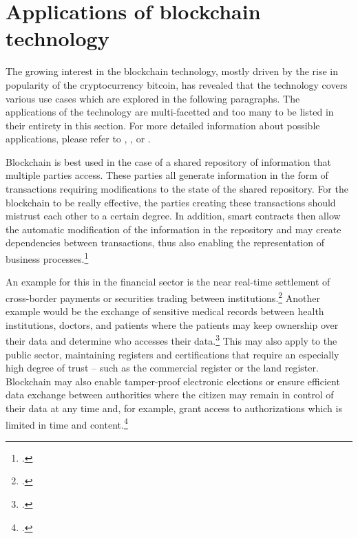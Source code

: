 \section{Applications of blockchain technology} \label{sec:SmartContracts}
The growing interest in the blockchain technology, mostly driven by the rise in popularity of the cryptocurrency bitcoin, has revealed that the technology covers various use cases which are explored in the following paragraphs. The applications of the technology are multi-facetted and too many to be listed in their entirety in this section. For more detailed information about possible applications, please refer to \cite{AntonopolousAndreasM..2017}, \cite{SchatskybitcoinBlockchaincoming2015}, or \cite{Schutte.2017}.

Blockchain is best used in the case of a shared repository of information that multiple parties access. These parties all generate information in the form of transactions requiring modifications to the state of the shared repository. For the blockchain to be really effective, the parties creating these transactions should mistrust each other to a certain degree. In addition, smart contracts then allow the automatic modification of the information in the repository and may create dependencies between transactions, thus also enabling the representation of business processes.\footcites[Cf.][p.8]{MulliganBlockchainHypePractical2018}[cf.][p.5]{Tapscott.2017}[cf.][p.166]{DannenIntroducingethereumsolidity2017}

An example for this in the financial sector is the near real-time settlement of cross-border payments or securities trading between institutions.\footcite[Cf.][]{SchatskybitcoinBlockchaincoming2015} Another example would be the exchange of sensitive medical records between health institutions, doctors, and patients where the patients may keep ownership over their data and determine who accesses their data.\footcites[Cf.][p.170]{DannenIntroducingethereumsolidity2017}[cf.][p.18]{Schutte.2017} This may also apply to the public sector, maintaining registers and certifications that require an especially high degree of trust – such as the commercial register or the land register. Blockchain may also enable tamper-proof electronic elections or ensure efficient data exchange between authorities where the citizen may remain in control of their data at any time and, for example, grant access to authorizations which is limited in time and content.\footcites[Cf.][p.18]{Schutte.2017}  


